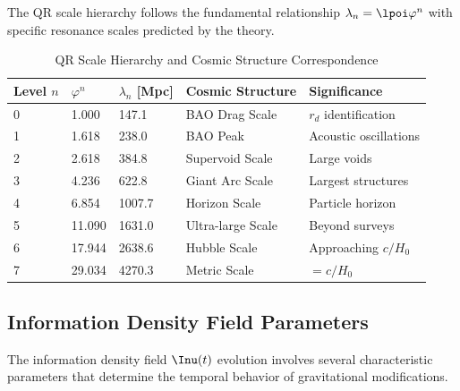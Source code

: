 The QR scale hierarchy follows the fundamental relationship $\lambda_n = \lpoi \varphi^n$ with specific resonance scales predicted by the theory.

\begin{table}[H]
  \caption{QR Scale Hierarchy and Cosmic Structure Correspondence}
  \label{tab:scale-hierarchy-complete}
  \centering
  \begin{tabular}{@{}lllll@{}}
    \toprule
    \textbf{Level $n$} & \textbf{$\varphi^n$} & \textbf{$\lambda_n$ [Mpc]} & \textbf{Cosmic Structure} & \textbf{Significance} \\
    \midrule
    0 & 1.000  & 147.1  & BAO Drag Scale      & $r_d$ identification \\
    1 & 1.618  & 238.0  & BAO Peak            & Acoustic oscillations \\
    2 & 2.618  & 384.8  & Supervoid Scale     & Large voids \\
    3 & 4.236  & 622.8  & Giant Arc Scale     & Largest structures \\
    4 & 6.854  & 1007.7 & Horizon Scale       & Particle horizon \\
    5 & 11.090 & 1631.0 & Ultra-large Scale   & Beyond surveys \\
    6 & 17.944 & 2638.6 & Hubble Scale        & Approaching $c/H_0$ \\
    7 & 29.034 & 4270.3 & Metric Scale        & $= c/H_0$ \\
    \bottomrule
  \end{tabular}
\end{table}

\subsection{Information Density Field Parameters}
\label{subsec:information-density-parameters}

The information density field $\Inu(t)$ evolution involves several characteristic parameters that determine the temporal behavior of gravitational modifications.


